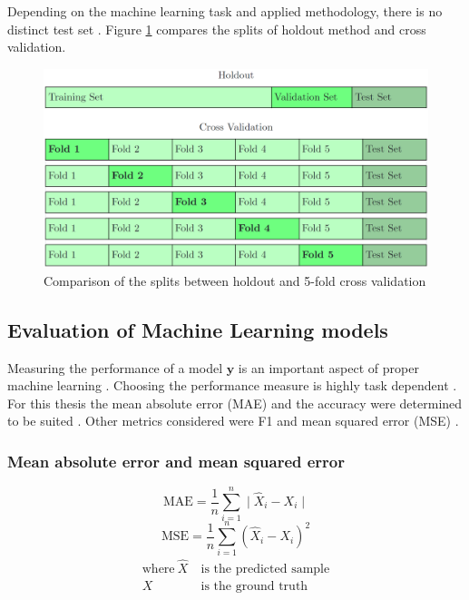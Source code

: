\documentclass[draft,final,oneside]{vutinfth} %
\begin{document}
Depending on the machine learning task and applied methodology, there is no distinct test set \cite{holdoutcrossvalidation}. Figure \ref{fig:holdoutvscv} compares the splits of holdout method and cross validation.

\begin{figure}[ht]
	\centering
  	\includegraphics[width=1.0\textwidth]{graphics/holdoutvscv.png}
	\caption{Comparison of the splits between holdout and 5-fold cross validation}
	\label{fig:holdoutvscv}
\end{figure}

\subsection{Evaluation of Machine Learning models}

Measuring the performance of a model $\boldsymbol{y}$ is an important aspect of proper machine learning \cite{performanceevaluation}. Choosing the performance measure is highly task dependent \cite{performanceevaluation}. For this thesis the mean absolute error (MAE) and the accuracy were determined to be suited \cite{accuracy}. Other metrics considered were F1 and mean squared error (MSE) \cite{accuracy} \cite{Powers2008EvaluationFP}.

\subsubsection{Mean absolute error and mean squared error}
\begin{equation}
\text{MAE} = \frac{1}{n}\textstyle \sum_{i=1}^n \displaystyle\mid \hat{X}_i - X_i \mid
\end{equation}
\begin{equation}
\text{MSE} = \frac{1}{n}\textstyle \sum_{i=1}^n \displaystyle\left( \hat{X}_i - X_i \right)^2
\end{equation}
\begin{align*}
\text{where}~\hat{X}&~\text{is the predicted sample} \\
X&~\text{is the ground truth}
\end{align*}
\end{document}
